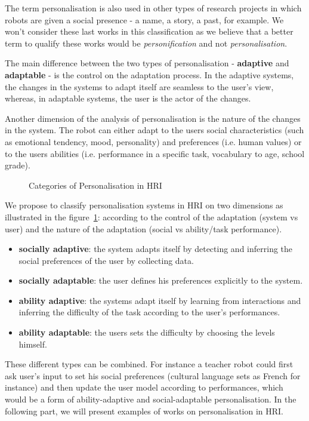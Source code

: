 \documentclass[a4paper,twocolumn]{svjour3}
\begin{document}
The term personalisation is also used in other types of research projects in which robots are given a social presence - a name, a story, a past, for example. 
We won't consider these last works in this classification as we believe that a better term to qualify these works would be \emph{personification} and not \emph{personalisation}. 


The main difference between the two types of personalisation - \textbf{adaptive} and \textbf{adaptable} - is the control on the adaptation process. 
In the adaptive systems, the changes in the systems to adapt itself are seamless to the user's view, whereas, in adaptable systems, the user is the actor of the changes. 

Another dimension of the analysis of personalisation is the nature of the changes in the system. 
The robot can either adapt to the users social characteristics (such as emotional tendency, mood, personality) and preferences (i.e. human values) or to the users abilities (i.e. performance in a specific task, vocabulary to age, school grade).
\begin{figure}[h]
	\centering
	\caption{Categories of Personalisation in HRI}
	\label{fig:personalisation}
\end{figure}
We propose to classify personalisation systems in HRI on two dimensions as illustrated in the figure~\ref{fig:personalisation}: according to the control of the adaptation (system vs user) and the nature of the adaptation (social vs ability/task performance).

\begin{itemize}[noitemsep,nolistsep]
	\item \textbf{socially adaptive}: the system adapts itself by detecting and inferring the social preferences of the user by collecting data.
	\item \textbf{socially adaptable}: the user defines his preferences explicitly to the system. 
	\item \textbf{ability adaptive}: the systems adapt itself by learning from interactions and inferring the difficulty of the task according to the user's performances.
	\item \textbf{ability adaptable}: the users sets the difficulty by choosing the levels himself.
\end{itemize}
These different types can be combined.
For instance a teacher robot could first ask user's input to set his social preferences (cultural language sets as French for instance) and then update the user model according to performances, which would be a form of ability-adaptive and social-adaptable personalisation.
In the following part, we will present examples of works on personalisation in HRI. 
\end{document}

